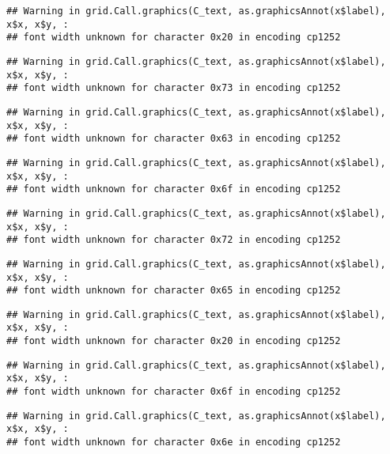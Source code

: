 \documentclass[
]{article}
\begin{document}
\begin{verbatim}
## Warning in grid.Call.graphics(C_text, as.graphicsAnnot(x$label), x$x, x$y, :
## font width unknown for character 0x20 in encoding cp1252
\end{verbatim}

\begin{verbatim}
## Warning in grid.Call.graphics(C_text, as.graphicsAnnot(x$label), x$x, x$y, :
## font width unknown for character 0x73 in encoding cp1252
\end{verbatim}

\begin{verbatim}
## Warning in grid.Call.graphics(C_text, as.graphicsAnnot(x$label), x$x, x$y, :
## font width unknown for character 0x63 in encoding cp1252
\end{verbatim}

\begin{verbatim}
## Warning in grid.Call.graphics(C_text, as.graphicsAnnot(x$label), x$x, x$y, :
## font width unknown for character 0x6f in encoding cp1252
\end{verbatim}

\begin{verbatim}
## Warning in grid.Call.graphics(C_text, as.graphicsAnnot(x$label), x$x, x$y, :
## font width unknown for character 0x72 in encoding cp1252
\end{verbatim}

\begin{verbatim}
## Warning in grid.Call.graphics(C_text, as.graphicsAnnot(x$label), x$x, x$y, :
## font width unknown for character 0x65 in encoding cp1252
\end{verbatim}

\begin{verbatim}
## Warning in grid.Call.graphics(C_text, as.graphicsAnnot(x$label), x$x, x$y, :
## font width unknown for character 0x20 in encoding cp1252
\end{verbatim}

\begin{verbatim}
## Warning in grid.Call.graphics(C_text, as.graphicsAnnot(x$label), x$x, x$y, :
## font width unknown for character 0x6f in encoding cp1252
\end{verbatim}

\begin{verbatim}
## Warning in grid.Call.graphics(C_text, as.graphicsAnnot(x$label), x$x, x$y, :
## font width unknown for character 0x6e in encoding cp1252
\end{verbatim}
\end{document}
